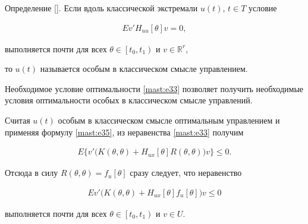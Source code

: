 



\smallskip



{\small \sc Определение [].} Если вдоль классической экстремали  $ u(t) $, $ t\in T $  условие

\begin{gather}

   \label{mast:e36}

E v' H_{uu}[\theta] v = 0,   

 \end{gather}

выполняется  почти для всех $ \theta \in \left[ t_{0}, t_{1} \right)  $ и $ v \in \mathbb  R^{r} $,  

то $ u(t) $ называется особым в  классическом смысле управлением.


\smallskip





Необходимое условие оптимальности \eqref{mast:e33}  позволяет получить необходимые условия оптимальности  особых в классическом смысле управлений.



Считая $ u(t) $ особым  в классическом смысле оптимальным управлением и применяя формулу \eqref{mast:e35},  из неравенства \eqref{mast:e33}  получим 

\begin{gather*}

E \bigl\lbrace  v' \bigl( K(\theta,\theta)+ H_{ux}[\theta] R(\theta, \theta) \bigr)  v\bigr\rbrace  \leq 0.  

\end{gather*}

Отсюда в силу $ R(\theta, \theta)=f_{u}[\theta] $ сразу следует, что неравенство

\begin{gather}

E v' \bigl( K(\theta,\theta)+ H_{ux}[\theta] f_{u}[\theta] \bigr)  v  \leq 0

\label{mast:e37}

\end{gather}

 выполняется   почти для всех $ \theta \in \left[ t_{0}, t_{1} \right)  $  и $ v \in U $.



